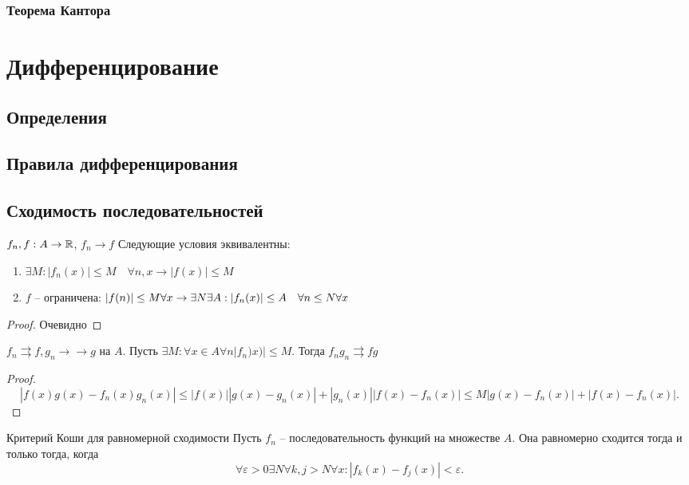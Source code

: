 \documentclass[12pt]{report}
\begin{document}
\subsection{Теорема Кантора}
\chapter{Дифференцирование}
\section{Определения}
\section{Правила дифференцирования}
\section{Сходимость последовательностей}
\begin{thm}
    $f_n, f : A \to  \mathbb{R}$, $f_n \to  f$
    Следующие условия эквивалентны:
     \begin{enumerate}
	 \item $\exists M : |f_n(x)| \le  M \quad \forall  n, x \longrightarrow |f(x)| \le  M$
	 \item $f$ -- ограничена: $|f(n)| \le  M \forall  x \to \exists  N \exists  A: \\
	     |f_n(x)| \le A \quad \forall  n \le  N \forall  x$
    \end{enumerate}
\end{thm}
\begin{proof}
    Очевидно
\end{proof}
\begin{thm}
    $f_n \rightrightarrows  f, g_n \to  \to  g$ на $A$.
    Пусть $\exists M: \forall x \in A \forall  n |f_n)x) | \le  M$. Тогда  $f_n g_n \rightrightarrows fg$
\end{thm}
\begin{proof}
    \[
	|f(x) g(x) - f_n(x) g_n(x)| \le  |f(x) ||g(x) - g_n(x) | + | g_n(x)| |f(x) - f_n(x)| \le  M | g(x) - f_n(x)  |+ | f(x) - f_n(x)|
    .\]  
\end{proof}
\begin{thm}{Критерий Коши для равномерной сходимости}
    Пусть $f_n$ -- последовательность функций на множестве $A$. Она равномерно сходится  тогда и только тогда, когда  
    \[
	\forall  \varepsilon >0 \exists  N \forall  k, j> N \forall x : |f_k(x) - f_j(x)| < \varepsilon 
    .\] \label{usl}
\end{thm}
\end{document}
